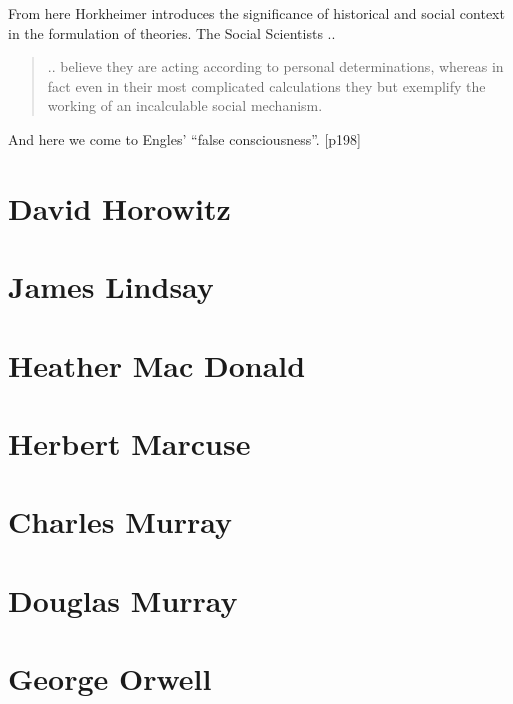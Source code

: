 \documentclass[10pt,titlepage]{book}
\begin{document}
From here Horkheimer introduces the significance of historical and social context in the formulation of theories.
The Social Scientists ..
\begin{quote}
.. believe they are acting according to personal
determinations, whereas in fact even in their most complicated
calculations they but exemplify the working of an incalculable
social mechanism.
\end{quote}

And here we come to Engles' ``false consciousness''. [p198]

\section{David Horowitz}

\cite{horowitz-paau,horowitz-bbal}

\section{James Lindsay}

\cite{pluckrose-cynical,lindsay-everybody,pluckrose-cynical}

\section{Heather Mac Donald}

\cite{macdonald-bbi, macdonald-woc, macdonald-tdd}

\section{Herbert Marcuse}

\cite{marcuse-magee}
\cite{marcuse-repressive}

\section{Charles Murray}

\cite{murrayc-tbc,murrayc-hd}

\section{Douglas Murray}

\cite{murrayd-vi,murrayd-sde,murrayd-tmc}

\section{George Orwell}
\end{document}
